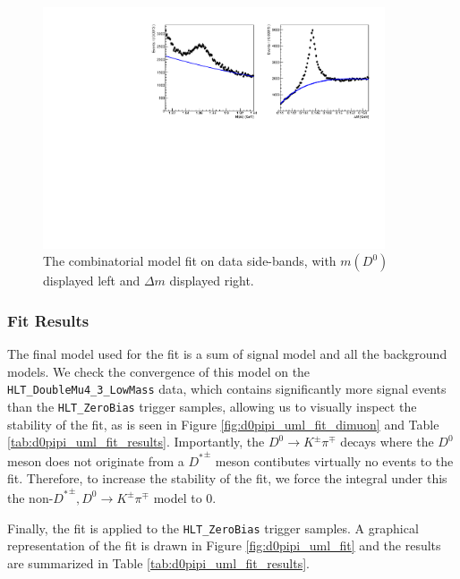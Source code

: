 \begin{figure}[htp]
    \begin{center}
      \includegraphics[width=0.9\textwidth]{figures/chapter4/normalization_fit/dpipi_fit_comb.pdf}
    \end{center}
    \caption{
      The combinatorial model fit on data side-bands, with $m(D^0)$ displayed left and $\Delta m$ displayed right.
    }
    \label{fig:d0pipi_uml_fit_comb_model}
\end{figure}

\subsubsection{Fit Results}

The final model used for the fit is a sum of signal model and all the background models. We check the convergence of this model on the \texttt{HLT\_DoubleMu4\_3\_LowMass} data, which contains significantly more signal events than the \texttt{HLT\_ZeroBias} trigger samples, allowing us to visually inspect the stability of the fit, as is seen in Figure \ref{fig:d0pipi_uml_fit_dimuon} and Table \ref{tab:d0pipi_uml_fit_results}. Importantly, the $D^0 \to K^\pm \pi^\mp$ decays where the $D^0$ meson does not originate from a ${D^*}^\pm$ meson contibutes virtually no events to the fit. Therefore, to increase the stability of the fit, we force the integral under this the non-${D^*}^\pm,D^0 \to K^\pm \pi^\mp$ model to 0. 

Finally, the fit is applied to the \texttt{HLT\_ZeroBias} trigger samples. A graphical representation of the fit is drawn in Figure \ref{fig:d0pipi_uml_fit} and the results are summarized in Table \ref{tab:d0pipi_uml_fit_results}.


